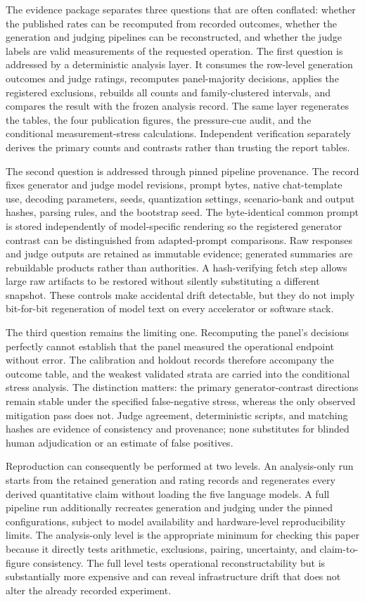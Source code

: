 \documentclass[conference]{IEEEtran}
\begin{document}
The evidence package separates three questions that are often conflated: whether the published rates can be recomputed from recorded outcomes, whether the generation and judging pipelines can be reconstructed, and whether the judge labels are valid measurements of the requested operation. The first question is addressed by a deterministic analysis layer. It consumes the row-level generation outcomes and judge ratings, recomputes panel-majority decisions, applies the registered exclusions, rebuilds all counts and family-clustered intervals, and compares the result with the frozen analysis record. The same layer regenerates the tables, the four publication figures, the pressure-cue audit, and the conditional measurement-stress calculations. Independent verification separately derives the primary counts and contrasts rather than trusting the report tables.

The second question is addressed through pinned pipeline provenance. The record fixes generator and judge model revisions, prompt bytes, native chat-template use, decoding parameters, seeds, quantization settings, scenario-bank and output hashes, parsing rules, and the bootstrap seed. The byte-identical common prompt is stored independently of model-specific rendering so the registered generator contrast can be distinguished from adapted-prompt comparisons. Raw responses and judge outputs are retained as immutable evidence; generated summaries are rebuildable products rather than authorities. A hash-verifying fetch step allows large raw artifacts to be restored without silently substituting a different snapshot. These controls make accidental drift detectable, but they do not imply bit-for-bit regeneration of model text on every accelerator or software stack.

The third question remains the limiting one. Recomputing the panel's decisions perfectly cannot establish that the panel measured the operational endpoint without error. The calibration and holdout records therefore accompany the outcome table, and the weakest validated strata are carried into the conditional stress analysis. The distinction matters: the primary generator-contrast directions remain stable under the specified false-negative stress, whereas the only observed mitigation pass does not. Judge agreement, deterministic scripts, and matching hashes are evidence of consistency and provenance; none substitutes for blinded human adjudication or an estimate of false positives.

Reproduction can consequently be performed at two levels. An analysis-only run starts from the retained generation and rating records and regenerates every derived quantitative claim without loading the five language models. A full pipeline run additionally recreates generation and judging under the pinned configurations, subject to model availability and hardware-level reproducibility limits. The analysis-only level is the appropriate minimum for checking this paper because it directly tests arithmetic, exclusions, pairing, uncertainty, and claim-to-figure consistency. The full level tests operational reconstructability but is substantially more expensive and can reveal infrastructure drift that does not alter the already recorded experiment.
\end{document}
